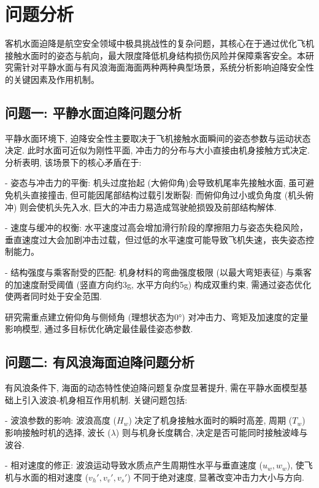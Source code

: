 \documentclass{cumcmthesis}
\begin{document}
\section{问题分析}

客机水面迫降是航空安全领域中极具挑战性的复杂问题，其核心在于通过优化飞机接触水面时的姿态与航向，最大限度降低机身结构损伤风险并保障乘客安全。本研究需针对平静水面与有风浪海面海面两种两种典型场景，系统分析影响迫降安全性的关键因素及作用机制。

\subsection{问题一: 平静水面迫降问题分析}

平静水面环境下, 迫降安全性主要取决于飞机接触水面瞬间的姿态参数与运动状态决定. 此时水面可近似为刚性平面, 冲击力的分布与大小直接由机身接触方式决定. 分析表明, 该场景下的核心矛盾在于: 

- 姿态与冲击力的平衡: 机头过度抬起 (大俯仰角)会导致机尾率先接触水面, 虽可避免机头直接撞击, 但可能因尾部结构过载引发断裂: 而俯仰角过小或负角度 (机头俯冲) 则会使机头先入水, 巨大的冲击力易造成驾驶舱损毁及前部结构解体.

- 速度与缓冲的权衡: 水平速度过高会增加滑行阶段的摩擦阻力与姿态失稳风险，垂直速度过大会加剧冲击过载，但过低的水平速度可能导致飞机失速，丧失姿态控制能力。

- 结构强度与乘客耐受的匹配: 机身材料的弯曲强度极限 (以最大弯矩表征) 与乘客的加速度耐受阈值 (竖直方向约3g, 水平方向约5g) 构成双重约束, 需通过姿态优化使两者同时处于安全范围.

研究需重点建立俯仰角与侧倾角 (理想状态为0°) 对冲击力、弯矩及加速度的定量影响模型, 通过多目标优化确定最佳最佳姿态参数. 

\subsection{问题二: 有风浪海面迫降问题分析}

有风浪条件下, 海面的动态特性使迫降问题复杂度显著提升, 需在平静水面模型基础上引入波浪-机身相互作用机制. 关键问题包括:

- 波浪参数的影响: 波浪高度 ($H_w$) 决定了机身接触水面时的瞬时高差, 周期 ($T_w$) 影响接触时机的选择, 波长 ($\lambda$) 则与机身长度耦合, 决定是否可能同时接触波峰与波谷. 

- 相对速度的修正: 波浪运动导致水质点产生周期性水平与垂直速度 ($u_w, w_w$), 使飞机与水面的相对速度 ($v_h', v_v', v_s'$) 不同于绝对速度, 显著改变冲击力大小与方向. 
\end{document}
